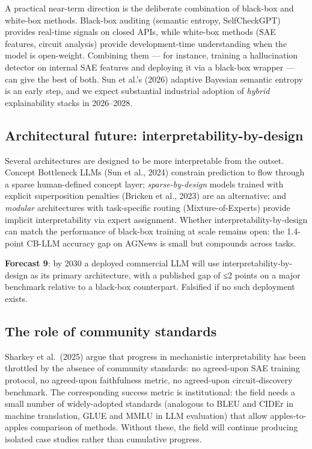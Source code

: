 A practical near-term direction is the deliberate combination of black-box and white-box methods. Black-box auditing (semantic entropy, SelfCheckGPT) provides real-time signals on closed APIs, while white-box methods (SAE features, circuit analysis) provide development-time understanding when the model is open-weight. Combining them --- for instance, training a hallucination detector on internal SAE features and deploying it via a black-box wrapper --- can give the best of both. Sun et al.'s (2026) adaptive Bayesian semantic entropy is an early step, and we expect substantial industrial adoption of \emph{hybrid} explainability stacks in 2026--2028.

\subsection{Architectural future: interpretability-by-design}\label{architectural-future-interpretability-by-design}

Several architectures are designed to be more interpretable from the outset. Concept Bottleneck LLMs (Sun et al., 2024) constrain prediction to flow through a sparse human-defined concept layer; \emph{sparse-by-design} models trained with explicit superposition penalties (Bricken et al., 2023) are an alternative; and \emph{modular} architectures with task-specific routing (Mixture-of-Experts) provide implicit interpretability via expert assignment. Whether interpretability-by-design can match the performance of black-box training at scale remains open: the 1.4-point CB-LLM accuracy gap on AGNews is small but compounds across tasks.

\textbf{Forecast 9}: by 2030 a deployed commercial LLM will use interpretability-by-design as its primary architecture, with a published gap of ≤2 points on a major benchmark relative to a black-box counterpart. Falsified if no such deployment exists.

\subsection{The role of community standards}\label{the-role-of-community-standards}

Sharkey et al.~(2025) argue that progress in mechanistic interpretability has been throttled by the absence of community standards: no agreed-upon SAE training protocol, no agreed-upon faithfulness metric, no agreed-upon circuit-discovery benchmark. The corresponding success metric is institutional: the field needs a small number of widely-adopted standards (analogous to BLEU and CIDEr in machine translation, GLUE and MMLU in LLM evaluation) that allow apples-to-apples comparison of methods. Without these, the field will continue producing isolated case studies rather than cumulative progress.

